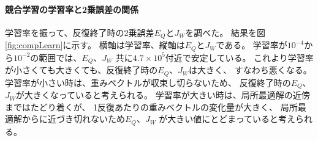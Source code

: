 \documentclass[a4j]{jarticle}
\begin{document}
\paragraph{競合学習の学習率と2乗誤差の関係}

学習率を振って、反復終了時の2乗誤差$E_Q$と$J_W$を調べた。
結果を図\ref{fig:compLearn}に示す。
横軸は学習率、縦軸は$E_Q$と$J_W$である。
学習率が$10^{-4}$から$10^{-2}$の範囲では、$E_Q$、$J_W$
共に$4.7\times 10^5$付近で安定している。
これより学習率が小さくても大きくても、反復終了時の$E_Q$、$J_W$は大きく、
すなわち悪くなる。
学習率が小さい時は、重みベクトルが収束し切らないため、
反復終了時の$E_Q$、$J_W$が大きくなっていると考えられる。
学習率が大きい時は、局所最適解の近傍まではたどり着くが、
1反復あたりの重みベクトルの変化量が大きく、
局所最適解からに近づき切れないため$E_Q$、$J_W$
が大きい値にとどまっていると考えられる。
\end{document}

